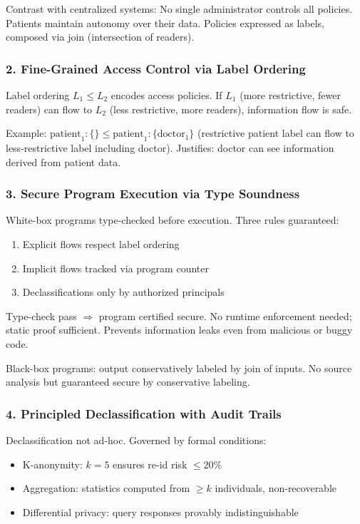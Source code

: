Contrast with centralized systems: No single administrator controls all policies. Patients maintain autonomy over their data. Policies expressed as labels, composed via join (intersection of readers).

\subsubsection{2. Fine-Grained Access Control via Label Ordering}

Label ordering $L_1 \leq L_2$ encodes access policies. If $L_1$ (more restrictive, fewer readers) can flow to $L_2$ (less restrictive, more readers), information flow is safe.

Example: $\text{patient}_1: \{\} \leq \text{patient}_1: \{\text{doctor}_1\}$ (restrictive patient label can flow to less-restrictive label including doctor). Justifies: doctor can see information derived from patient data.

\subsubsection{3. Secure Program Execution via Type Soundness}

White-box programs type-checked before execution. Three rules guaranteed:
\begin{enumerate}
\item Explicit flows respect label ordering
\item Implicit flows tracked via program counter
\item Declassifications only by authorized principals
\end{enumerate}

Type-check pass $\Rightarrow$ program certified secure. No runtime enforcement needed; static proof sufficient. Prevents information leaks even from malicious or buggy code.

Black-box programs: output conservatively labeled by join of inputs. No source analysis but guaranteed secure by conservative labeling.

\subsubsection{4. Principled Declassification with Audit Trails}

Declassification not ad-hoc. Governed by formal conditions:
\begin{itemize}
\item K-anonymity: $k=5$ ensures re-id risk $\leq 20\%$
\item Aggregation: statistics computed from $\geq k$ individuals, non-recoverable
\item Differential privacy: query responses provably indistinguishable
\end{itemize}

